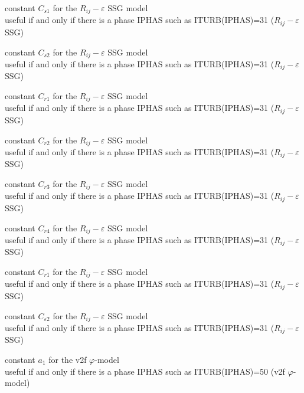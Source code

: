 {constant $C_{s1}$ for the $R_{ij}-\varepsilon$ SSG model\\
useful if and only if there is a phase IPHAS such as ITURB(IPHAS)=31
($R_{ij}-\varepsilon$ SSG)}

{constant $C_{s2}$ for the $R_{ij}-\varepsilon$ SSG model\\
useful if and only if there is a phase IPHAS such as ITURB(IPHAS)=31
($R_{ij}-\varepsilon$ SSG)}

{constant $C_{r1}$ for the $R_{ij}-\varepsilon$ SSG model\\
useful if and only if there is a phase IPHAS such as ITURB(IPHAS)=31
($R_{ij}-\varepsilon$ SSG)}

{constant $C_{r2}$ for the $R_{ij}-\varepsilon$ SSG model\\
useful if and only if there is a phase IPHAS such as ITURB(IPHAS)=31
($R_{ij}-\varepsilon$ SSG)}

{constant $C_{r3}$ for the $R_{ij}-\varepsilon$ SSG model\\
useful if and only if there is a phase IPHAS such as ITURB(IPHAS)=31
($R_{ij}-\varepsilon$ SSG)}

{constant $C_{r4}$ for the $R_{ij}-\varepsilon$ SSG model\\
useful if and only if there is a phase IPHAS such as ITURB(IPHAS)=31
($R_{ij}-\varepsilon$ SSG)}

{constant $C_{r1}$ for the $R_{ij}-\varepsilon$ SSG model\\
useful if and only if there is a phase IPHAS such as ITURB(IPHAS)=31
($R_{ij}-\varepsilon$ SSG)}

{constant $C_{\varepsilon 2}$ for the $R_{ij}-\varepsilon$ SSG model\\
useful if and only if there is a phase IPHAS such as ITURB(IPHAS)=31
($R_{ij}-\varepsilon$ SSG)}


{constant $a_1$ for the v2f $\varphi$-model\\
useful if and only if there is a phase IPHAS such as ITURB(IPHAS)=50
(v2f $\varphi$-model)}


